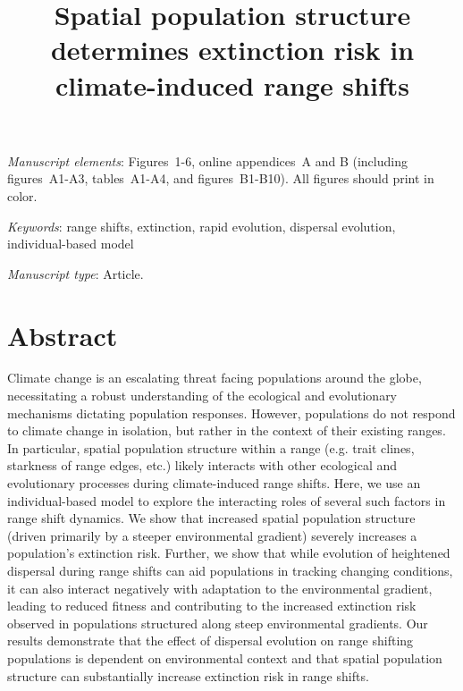 \documentclass[11pt]{article}
\title{Spatial population structure determines extinction risk in climate-induced range shifts}
\date{}
\begin{document}
\maketitle






\bigskip

\textit{Manuscript elements}: Figures~1-6, online appendices~A and B (including figures~A1-A3,  tables~A1-A4, and figures~B1-B10). All figures should print in color.

\bigskip

\textit{Keywords}: range shifts, extinction, rapid evolution, dispersal evolution, individual-based model

\bigskip

\textit{Manuscript type}: Article. %

\bigskip


\linenumbers{}
\modulolinenumbers[3]

\newpage{}

\section*{Abstract}
Climate change is an escalating threat facing populations around the globe, necessitating a robust understanding of the ecological and evolutionary mechanisms dictating population responses. However, populations do not respond to climate change in isolation, but rather in the context of their existing ranges. In particular, spatial population structure within a range (e.g. trait clines, starkness of range edges, etc.) likely interacts with other ecological and evolutionary processes during climate-induced range shifts. Here, we use an individual-based model to explore the interacting roles of several such factors in range shift dynamics. We show that increased spatial population structure (driven primarily by a steeper environmental gradient) severely increases a population's extinction risk. Further, we show that while evolution of heightened dispersal during range shifts can aid populations in tracking changing conditions, it can also interact negatively with adaptation to the environmental gradient, leading to reduced fitness and contributing to the increased extinction risk observed in populations structured along steep environmental gradients. Our results demonstrate that the effect of dispersal evolution on range shifting populations is dependent on environmental context and that spatial population structure can substantially increase extinction risk in range shifts.
\end{document}
